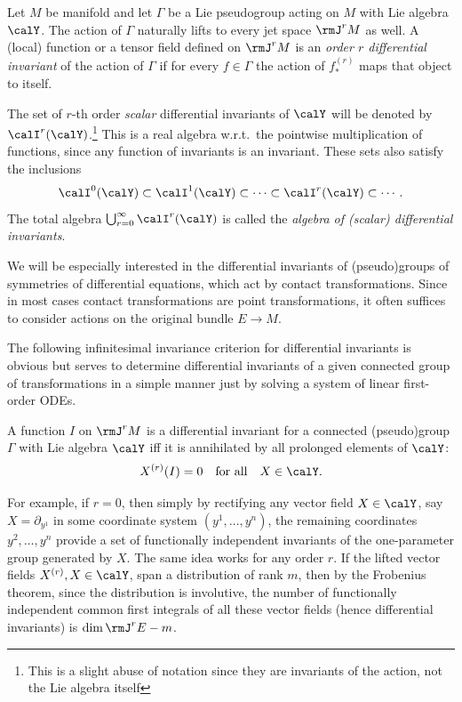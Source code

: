 \begin{defn}
    Let $M$ be manifold and let $\Gamma$ be a Lie pseudogroup acting on $M$ with Lie algebra $\calY$. The action of $\Gamma$ naturally lifts to every jet space $\rmJ^r M$ as well. A (local) function or a tensor field defined on $\rmJ^r M$ is an \emph{order $r$ differential invariant} of the action of $\Gamma$ if for every $f\in\Gamma$ the action of $f^{(r)}_\ast$ maps that object to itself.

    The set of $r$-th order \emph{scalar} differential invariants of $\calY$ will be denoted by $\calI^r(\calY)$.\footnote{This is a slight abuse of notation since they are invariants of the action, not the Lie algebra itself} This is a real algebra w.r.t.\ the pointwise multiplication of functions, since any function of invariants is an invariant. These sets also satisfy the inclusions 
    \[\calI^0(\calY)\subset\calI^1(\calY)\subset\cdots\subset\calI^r(\calY)\subset\cdots.\]
    The total algebra $\bigcup_{r=0}^\infty \calI^r(\calY)$ is called the \emph{algebra of (scalar) differential invariants}.
\end{defn}

We will be especially interested in the differential invariants of (pseudo)groups of symmetries of differential equations, which act by contact transformations. Since in most cases contact transformations are point transformations, it often suffices to consider actions on the original bundle $E\to M$.

The following infinitesimal invariance criterion for differential invariants is obvious but serves to determine differential invariants of a given connected group of transformations in a simple manner just by solving a system of linear first-order ODEs.

\begin{prop}
    A function $I$ on $\rmJ^r M$ is a differential invariant for a connected (pseudo)group $\Gamma$ with Lie algebra $\calY$ iff it is annihilated by all prolonged elements of $\calY$:
    \[X^{(r)}(I)=0\quad \text{for all}\quad X\in\calY.\]
\end{prop}

For example, if $r=0$, then simply by rectifying any vector field $X\in\calY$, say $X=\partial_{y^1}$ in some coordinate system $(y^1,\ldots,y^n)$, the remaining coordinates $y^2,\ldots,y^n$ provide a set of functionally independent invariants of the one-parameter group generated by $X$. The same idea works for any order $r$. If the lifted vector fields $X^{(r)},X\in\calY$, span a distribution of rank $m$, then by the Frobenius theorem, since the distribution is involutive, the number of functionally independent common first integrals of all these vector fields (hence differential invariants) is $\dim \rmJ^r E-m$.


